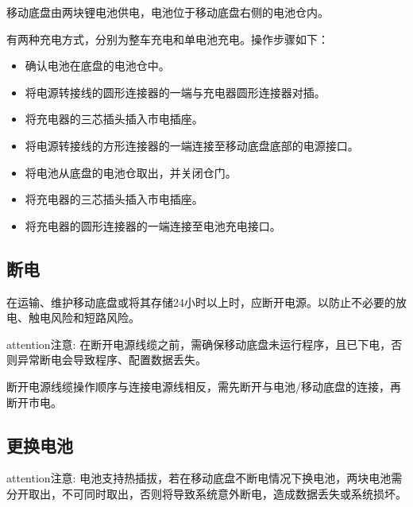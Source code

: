 \documentclass[a4paper,11pt,english,openany,oneside]{sphinxmanual}
\begin{document}
\sphinxAtStartPar
移动底盘由两块锂电池供电，电池位于移动底盘右侧的电池仓内。

\sphinxAtStartPar
有两种充电方式，分别为整车充电和单电池充电。操作步骤如下：

\sphinxAtStartPar
{}
\begin{itemize}
\item {} 
\sphinxAtStartPar
确认电池在底盘的电池仓中。

\item {} 
\sphinxAtStartPar
将电源转接线的圆形连接器的一端与充电器圆形连接器对插。

\item {} 
\sphinxAtStartPar
将充电器的三芯插头插入市电插座。

\item {} 
\sphinxAtStartPar
将电源转接线的方形连接器的一端连接至移动底盘底部的电源接口。

\end{itemize}

\sphinxAtStartPar
{}
\begin{itemize}
\item {} 
\sphinxAtStartPar
将电池从底盘的电池仓取出，并关闭仓门。

\item {} 
\sphinxAtStartPar
将充电器的三芯插头插入市电插座。

\item {} 
\sphinxAtStartPar
将充电器的圆形连接器的一端连接至电池充电接口。

\end{itemize}


\subsection{断电}
\label{\detokenize{08 _u5b89_u88c5_u4e0e_u8c03_u8bd5:id21}}\label{\detokenize{08 _u5b89_u88c5_u4e0e_u8c03_u8bd5:id22}}
\sphinxAtStartPar
在运输、维护移动底盘或将其存储24小时以上时，应断开电源。以防止不必要的放电、触电风险和短路风险。

\begin{sphinxadmonition}{attention}{注意:}
\sphinxAtStartPar
在断开电源线缆之前，需确保移动底盘未运行程序，且已下电，否则异常断电会导致程序、配置数据丢失。
\end{sphinxadmonition}

\sphinxAtStartPar
断开电源线缆操作顺序与连接电源线相反，需先断开与电池/移动底盘的连接，再断开市电。


\subsection{更换电池}
\label{\detokenize{08 _u5b89_u88c5_u4e0e_u8c03_u8bd5:id23}}\label{\detokenize{08 _u5b89_u88c5_u4e0e_u8c03_u8bd5:id24}}
\begin{sphinxadmonition}{attention}{注意:}
\sphinxAtStartPar
电池支持热插拔，若在移动底盘不断电情况下换电池，两块电池需分开取出，不可同时取出，否则将导致系统意外断电，造成数据丢失或系统损坏。
\end{sphinxadmonition}
\end{document}
